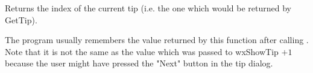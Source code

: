 \label{wxtipprovidergetcurrenttip}


Returns the index of the current tip (i.e. the one which would be returned by 
GetTip).

The program usually remembers the value returned by this function after calling 
. Note that it is not the same as the value which
was passed to wxShowTip $+ 1$ because the user might have pressed the "Next"
button in the tip dialog.

